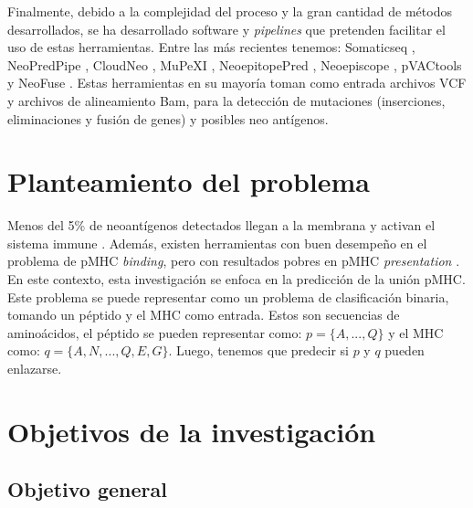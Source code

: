 \documentclass[a4paper]{article}
\begin{document}
Finalmente, debido a la complejidad del proceso y la gran cantidad de métodos desarrollados, se ha desarrollado software y \textit{pipelines} que pretenden facilitar el uso de estas herramientas. Entre las más recientes tenemos: Somaticseq \citep{fang2015ensemble}, NeoPredPipe \citep{schenck2019neopredpipe}, CloudNeo \citep{bais2017cloudneo}, MuPeXI \citep{bjerregaard2017mupexi}, NeoepitopePred \citep{tran2015immunogenicity}, Neoepiscope \citep{yossef2018enhanced}, pVACtools \citep{hundal2020pvactools}  y NeoFuse \citep{gros2016prospective}. Estas herramientas en su mayoría toman como entrada archivos VCF y archivos de alineamiento Bam, para la detección de mutaciones (inserciones, eliminaciones y fusión de genes) y posibles neo antígenos. 




\section{Planteamiento del problema}

Menos del 5\% de neoantígenos detectados llegan a la membrana y activan el sistema immune \citep{de2020neoantigen, mill2022neoms, bulik2019deep, bassani2015mass, yadav2014predicting}. Además, existen herramientas con buen desempeño en el problema de pMHC \textit{binding}, pero con resultados pobres en  pMHC \textit{presentation} \citep{bulik2019deep}. En este contexto, esta investigación se enfoca en la predicción de la unión pMHC. Este problema se puede representar como un problema de clasificación binaria, tomando un péptido y el MHC como entrada. Estos son secuencias de aminoácidos, el péptido se pueden representar como: $p = \{ A, ... , Q \}$ y el MHC como: $q = \{ A, N, ... ,Q, E, G \}$. Luego, tenemos que  predecir si $p$ y $q$ pueden enlazarse. %



	
\section{Objetivos de la investigación}
	
	\subsection{Objetivo general}
	
\end{document}
